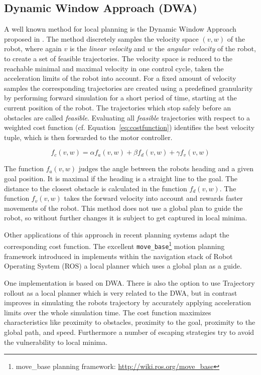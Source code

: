 \subsection{Dynamic Window Approach (DWA)}\label{sec:dwa}
A well known method for local planning is the Dynamic Window Approach proposed in \cite{DWA1997}. 
The method discretely samples the velocity space $(v,w)$ of the robot, where again $v$ is the \emph{linear velocity} and $w$ the \emph{angular velocity} of the robot, to create a set of feasible trajectories.
The velocity space is reduced to the reachable minimal and maximal velocity in one control cycle, taken the acceleration limits of the robot into account.
For a fixed amount of velocity samples the corresponding trajectories are created using a predefined granularity by performing forward simulation for a short period of time, starting at the current position of the robot. 
The trajectories which stop safely before an obstacles are called \emph{feasible}.
Evaluating all \emph{feasible} trajectories with respect to a weighted cost function (cf. Equation~\ref{eq:costfunction}) identifies the best velocity tuple, which is then forwarded to the motor controller.

\begin{equation}
   f_c(v,w)=\alpha f_a(v,w)+\beta f_d(v,w)+\gamma f_v(v,w)
   \label{eq:costfunction}
\end{equation}

The function $f_a(v,w)$ judges the angle between the robots heading and a given goal position.
It is maximal if the heading is a straight line to the goal.
The distance to the closest obstacle is calculated in the function $f_d(v,w)$.
The function $f_v(v,w)$ takes the forward velocity into account and rewards faster movements of the robot.
This method does not use a global plan to guide the robot, so without further changes it is subject to get captured in local minima.

Other applications of this approach in recent planning systems adapt the corresponding cost function. 
The excellent \texttt{move\_base}\footnote{move\_base planning framework: \url{http://wiki.ros.org/move_base}} motion planning framework introduced in \cite{DBLP:conf/icra/Marder-EppsteinBFGK10} implements within the navigation stack of Robot Operating System (ROS) a local planner which uses a global plan as a guide.

One implementation is based on DWA.
There is also the option to use Trajectory rollout \cite{gerkey08planning} as a local planner which is very related to the DWA, but in contrast improves in simulating the robots trajectory by accurately applying acceleration limits over the whole simulation time.
The cost function maximizes characteristics like proximity to obstacles, proximity to the goal, proximity to the global path, and speed.
Furthermore a number of escaping strategies try to avoid the vulnerability to local minima. 

